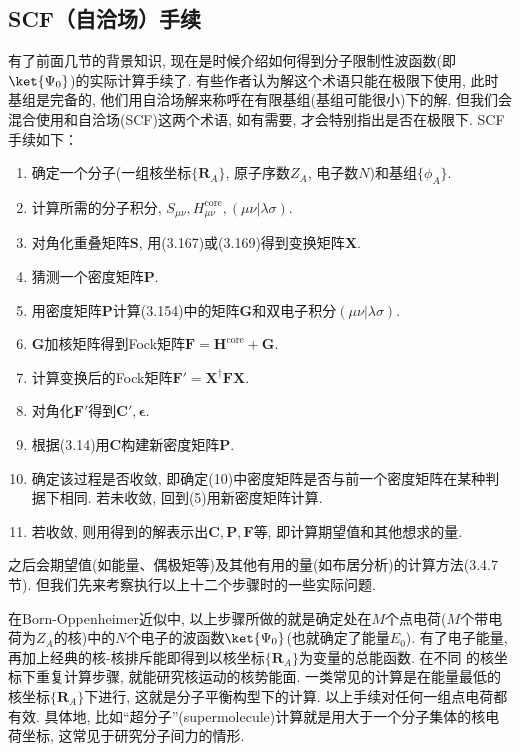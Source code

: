 \subsection{SCF（自洽场）手续}
有了前面几节的背景知识, 现在是时候介绍如何得到分子限制性波函数(即$\ket{\Psi_0}$)的实际计算手续了. 有些作者认为\hft 解这个术语只能在\hft 极限下使用, 此时基组是完备的, 他们用自洽场解来称呼在有限基组(基组可能很小)下的解. 但我们会混合使用\hft 和自洽场(SCF)这两个术语, 如有需要, 才会特别指出是否在\hft 极限下. SCF手续如下：
\begin{enumerate}[1.]
	\item 确定一个分子(一组核坐标$\{\mathbf{R}_A\}$, 原子序数$Z_A$, 电子数$N$)和基组$\{\phi_A\}$.
	\item 计算所需的分子积分, $S_{\mu\nu},H_{\mu\nu}^\mathrm{core}, (\mu\nu|\lambda\sigma)$.
	\item 对角化重叠矩阵$\mathbf{S}$, 用(3.167)或(3.169)得到变换矩阵$\mathbf{X}$.
	\item 猜测一个密度矩阵$\mathbf{P}$.
	\item 用密度矩阵$\mathbf{P}$计算(3.154)中的矩阵$\mathbf{G}$和双电子积分$(\mu\nu|\lambda\sigma)$.
	\item $\mathbf{G}$加核\ha 矩阵得到Fock矩阵$\mathbf{F=H}^\mathrm{core}+\mathbf{G}$.
	\item 计算变换后的Fock矩阵$\mathbf{F'=X^\dagger FX}$.
	\item 对角化$\mathbf{F'}$得到$\mathbf{C'},\bm{\epsilon}$.
	\item 根据(3.14)用$\mathbf{C}$构建新密度矩阵$\mathbf{P}$.
	\item 确定该过程是否收敛, 即确定(10)中密度矩阵是否与前一个密度矩阵在某种判据下相同. 若未收敛, 回到(5)用新密度矩阵计算.
	\item 若收敛, 则用得到的解表示出$\mathbf{C,P,F}$等, 即计算期望值和其他想求的量.
\end{enumerate}
之后会期望值(如能量、偶极矩等)及其他有用的量(如布居分析)的计算方法(3.4.7节). 但我们先来考察执行以上十二个步骤时的一些实际问题.

在Born-Oppenheimer近似中, 以上步骤所做的就是确定处在$M$个点电荷($M$个带电荷为$Z_A$的核)中的$N$个电子的波函数$\ket{\Psi_0}$(也就确定了能量$E_0$). 有了电子能量, 再加上经典的核-核排斥能即得到以核坐标$\{\mathbf{R}_A\}$为变量的总能函数. 在不同 的核坐标下重复计算步骤, 就能研究核运动的核势能面. 一类常见的计算是在能量最低的核坐标$\{\mathbf{R}_A\}$下进行, 这就是分子平衡构型下的计算. 以上手续对任何一组点电荷都有效. 具体地, 比如``超分子''(supermolecule)计算就是用大于一个分子集体的核电荷坐标, 这常见于研究分子间力的情形.

